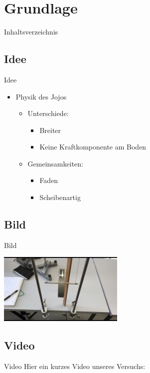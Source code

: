 \section{Grundlage}

\begin{frame}{Inhaltsverzeichnis}
\end{frame} 

\subsection{Idee}
\begin{frame}[t]{Idee}
    
\begin{itemize}
\item Physik des Jojos \pause %
\begin{itemize}
\item Unterschiede: \pause %
    \begin{itemize}
\item Breiter \pause
\item Keine Kraftkomponente am Boden \pause
\end{itemize}
\item Gemeinsamkeiten: \pause %
\begin{itemize}
\item Faden \pause 
\item Scheibenartig 
\end{itemize}
\end{itemize}
\end{itemize}
\end{frame}

\subsection{Bild}
\begin{frame}{Bild}
    \begin{center}
        \includegraphics[width=0.45\textwidth, angle= 90]{build/Bild1.jpg} %
    \end{center}
\end{frame}

\subsection{Video}
\begin{frame}{Video}
    Hier ein kurzes Video unseres Versuchs:
    \begin{center}
    \end{center}
\end{frame}
